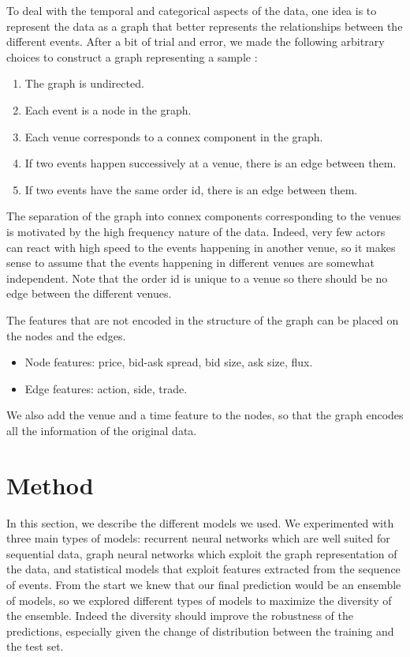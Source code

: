 \documentclass[switch, 11pt]{article}
\begin{document}
\begin{multicols}{2}
    To deal with the temporal and categorical aspects of the data, one idea is to represent the data as a graph that better represents the relationships between the different events. After a bit of trial and error, we made the following arbitrary choices to construct a graph representing a sample :
    \begin{enumerate}
        \item The graph is undirected.
        \item Each event is a node in the graph.
        \item Each venue corresponds to a connex component in the graph.
        \item If two events happen successively at a venue, there is an edge between them.
        \item If two events have the same order id, there is an edge between them.
    \end{enumerate}

    The separation of the graph into connex components corresponding to the venues is motivated by the high frequency nature of the data. Indeed, very few actors can react with high speed to the events happening in another venue, so it makes sense to assume that the events happening in different venues are somewhat independent. Note that the order id is unique to a venue so there should be no edge between the different venues.

    The features that are not encoded in the structure of the graph can be placed on the nodes and the edges.
    \begin{itemize}
        \item Node features: price, bid-ask spread, bid size, ask size, flux.
        \item Edge features: action, side, trade.
    \end{itemize}
    We also add the venue and a time feature to the nodes, so that the graph encodes all the information of the original data.

    \section{Method}

    In this section, we describe the different models we used. We experimented with three main types of models: recurrent neural networks which are well suited for sequential data, graph neural networks which exploit the graph representation of the data, and statistical models that exploit features extracted from the sequence of events. From the start we knew that our final prediction would be an ensemble of models, so we explored different types of models to maximize the diversity of the ensemble. Indeed the diversity should improve the robustness of the predictions, especially given the change of distribution between the training and the test set.


\end{multicols}
\end{document}
